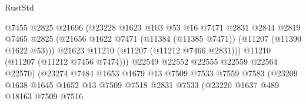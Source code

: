 \begin{lexlean}{RustStd}
\begin{coremodule}
                                        @7455
                                        @2825
                                        @21696
                                        (@23228
                                          @1623
                                          @103
                                          @53
                                          @16
                                          @7471
                                          @2831
                                          @2844
                                          @2819
                                          @7465
                                          @2825
                                          (@21656
                                            @1622
                                            @7471
                                            (@11384 (@11385 @7471))
                                            (@11207 (@11390 @1622 @53)))
                                          @21623
                                          @11210
                                          (@11207 (@11212 @7466 @2831)))
                                        @11210
                                        (@11207 (@11212 @7456 @7474)))
                                      @22549
                                      @22552
                                      @22555
                                      @22559
                                      @22564
                                      @22570)
                                    (@23274
                                      @7484
                                      @1653
                                      @1679
                                      @13
                                      @7509
                                      @7533
                                      @7559
                                      @7583
                                      (@23209
                                        @1638
                                        @1645
                                        @1652
                                        @13
                                        @7509
                                        @7518
                                        @2831
                                        @7533
                                        (@23220
                                          @1637
                                          @489
                                          @18163
                                          @7509
                                          @7516

\end{coremodule}
\end{lexlean}
